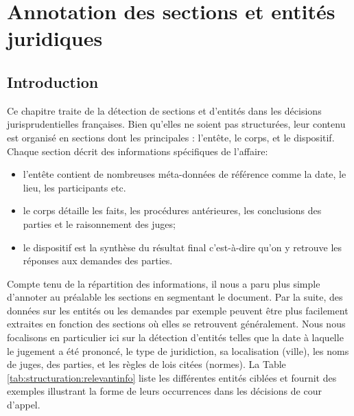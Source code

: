 \chapter{Annotation des sections et entités juridiques}
\label{chap:structuration}


\section{Introduction}
\label{sec:structuration:motivation}
Ce chapitre traite de la détection de sections et d'entités dans les décisions jurisprudentielles françaises. Bien qu'elles ne soient pas structurées, leur contenu est organisé en sections dont les principales : l'entête, le corps, et le dispositif. Chaque section décrit des informations spécifiques de l'affaire: 
\begin{itemize}
	\item l'entête contient de nombreuses méta-données de référence comme la date, le lieu, les participants etc.
	\item le corps détaille les faits, les procédures antérieures, les conclusions des parties et le raisonnement des juges;
	\item le dispositif est la synthèse du résultat final c'est-à-dire qu'on y retrouve les réponses aux demandes des parties.
\end{itemize}

Compte tenu de la répartition des informations, il nous a paru plus simple d'annoter au préalable les sections en segmentant le document. Par la suite, des données sur les entités ou les demandes par exemple peuvent être plus facilement extraites en fonction des sections où elles se retrouvent généralement. Nous nous focalisons en particulier ici sur la détection d'entités telles que la date à laquelle le jugement a été prononcé, le type de juridiction, sa localisation (ville), les noms de juges, des parties, et les règles de lois citées (normes). La Table \ref{tab:structuration:relevantinfo} liste les différentes entités ciblées et fournit des exemples illustrant la forme de leurs occurrences dans les décisions de cour d'appel.

